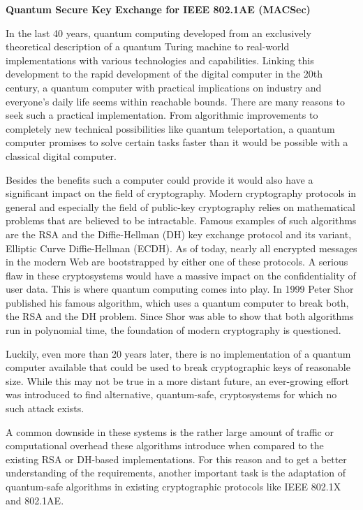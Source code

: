 \documentclass[BCOR=5mm,DIV=12]{scrbook}
\begin{document}
\vspace*{2cm}

\begin{center}
    \textbf{Quantum Secure Key Exchange for IEEE 802.1AE (MACSec)}
\end{center}

\vspace*{1cm}

\noindent In the last 40 years, quantum computing developed from an exclusively theoretical description of a quantum Turing machine to real-world implementations with various technologies and capabilities. Linking this development to the rapid development of the digital computer in the 20th century, a quantum computer with practical implications on industry and everyone's daily life seems within reachable bounds. There are many reasons to seek such a practical implementation. From algorithmic improvements to completely new technical possibilities like quantum teleportation, a quantum computer promises to solve certain tasks faster than it would be possible with a classical digital computer.

\par Besides the benefits such a computer could provide it would also have a significant impact on the field of cryptography. Modern cryptography protocols in general and especially the field of public-key cryptography relies on mathematical problems that are believed to be intractable. Famous examples of such algorithms are the RSA and the Diffie-Hellman (DH) key exchange protocol and its variant, Elliptic Curve Diffie-Hellman (ECDH). As of today, nearly all encrypted messages in the modern Web are bootstrapped by either one of these protocols. A serious flaw in these cryptosystems would have a massive impact on the confidentiality of user data. This is where quantum computing comes into play. In 1999 Peter Shor published his famous algorithm, which uses a quantum computer to break both, the RSA and the DH problem. Since Shor was able to show that both algorithms run in polynomial time, the foundation of modern cryptography is questioned.

Luckily, even more than 20 years later, there is no implementation of a quantum computer available that could be used to break cryptographic keys of reasonable size. While this may not be true in a more distant future, an ever-growing effort was introduced to find alternative, quantum-safe, cryptosystems for which no such attack exists.

A common downside in these systems is the rather large amount of traffic or computational overhead these algorithms introduce when compared to the existing RSA or DH-based implementations. For this reason and to get a better understanding of the requirements, another important task is the adaptation of quantum-safe algorithms in existing cryptographic protocols like IEEE 802.1X and 802.1AE.
\end{document}
